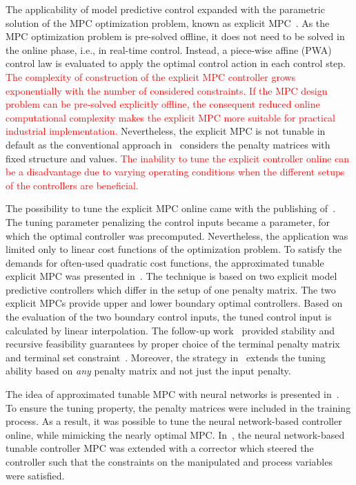 \documentclass[preprint,12pt]{elsarticle}
\newcommand{\change}[1]{\textcolor{red}{#1}}
\begin{document}
	The applicability of model predictive control expanded with the parametric solution of the MPC optimization problem, known as explicit MPC~\cite{Bemporad_automatica}. As the MPC optimization problem is pre-solved offline, it does not need to be solved in the online phase, i.e., in real-time control. Instead, a piece-wise affine (PWA) control law is evaluated to apply the optimal control action in each control step.
	\change{The complexity of construction of the explicit MPC controller grows exponentially with the number of considered constraints. If the MPC design problem can be pre-solved explicitly offline, the consequent reduced online computational complexity makes the explicit MPC more suitable for practical industrial implementation.} Nevertheless, the explicit MPC is not tunable in default as the conventional approach in~\cite{Bemporad_automatica} considers the penalty matrices with fixed structure and values. \change{The inability to tune the explicit controller online can be a disadvantage due to varying operating conditions when the different setups of the controllers are beneficial.}
	
	The possibility to tune the explicit MPC online came with the publishing of~\cite{Baric_tunable}. The tuning parameter penalizing the control inputs became a parameter, for which the optimal controller was precomputed. Nevertheless, the application was limited only to linear cost functions of the optimization problem. To satisfy the demands for often-used quadratic cost functions, the approximated tunable explicit MPC was presented in~\cite{Klauco_tunable}. The technique is based on two explicit model predictive controllers which differ in the setup of one penalty matrix. The two explicit MPCs provide upper and lower boundary optimal controllers. Based on the evaluation of the two boundary control inputs, the tuned control input is calculated by linear interpolation. The follow-up work~\cite{Oravec_tunable} provided stability and recursive feasibility guarantees by proper choice of the terminal penalty matrix and terminal set constraint~\cite{Mayne_stability}. Moreover, the strategy in~\cite{Oravec_tunable} extends the tuning ability based on \textit{any} penalty matrix and not just the input penalty.
	
	The idea of approximated tunable MPC with neural networks is presented in~\cite{Kis_NN_MPC}. To ensure the tuning property, the penalty matrices were included in the training process. As a result, it was possible to tune the neural network-based controller online, while mimicking the nearly optimal MPC. In~\cite{Kis_NN_MPC_corrector}, the neural network-based tunable controller MPC was extended with a corrector which steered the controller such that the constraints on the manipulated and process variables were satisfied. 
	
\end{document}

